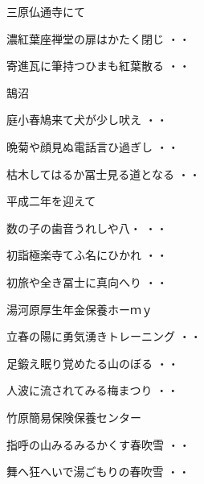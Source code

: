 \vspace{0.6cm}
三原仏通寺にて
\begin{shiika}濃紅葉座禅堂の扉はかたく閉じ
\hfill{・・}\end{shiika}
\begin{shiika}寄進瓦に筆持つひまも紅葉散る
\hfill{・・}\end{shiika}
\vspace{0.6cm}
鵠沼
\begin{shiika}庭小春鳩来て犬が少し吠え
\hfill{・・}\end{shiika}
\begin{shiika}晩菊や顔見ぬ電話言ひ過ぎし
\hfill{・・}\end{shiika}
\begin{shiika}枯木してはるか冨士見る道となる
\hfill{・・}\end{shiika}
\vspace{0.6cm}
平成二年を迎えて
\begin{shiika}数の子の歯音うれしや八・
\hfill{・・}\end{shiika}
\begin{shiika}初詣極楽寺てふ名にひかれ
\hfill{・・}\end{shiika}
\begin{shiika}初旅や全き冨士に真向へり
\hfill{・・}\end{shiika}
\vspace{0.6cm}
湯河原厚生年金保養ホーｍｙ
\begin{shiika}立春の陽に勇気湧きトレーニング
\hfill{・・}\end{shiika}
\begin{shiika}足鍛え眠り覚めたる山のぼる
\hfill{・・}\end{shiika}
\begin{shiika}人波に流されてみる梅まつり
\hfill{・・}\end{shiika}
\vspace{0.6cm}
竹原簡易保険保養センター
\begin{shiika}指呼の山みるみるかくす春吹雪
\hfill{・・}\end{shiika}
\begin{shiika}舞へ狂へいで湯ごもりの春吹雪
\hfill{・・}\end{shiika}
